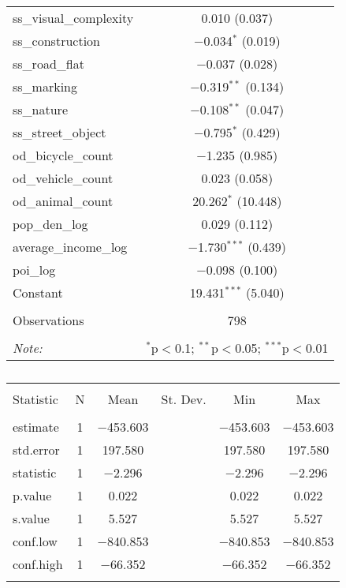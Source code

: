 \begin{table}[!htbp]
\begin{tabular}{@{\extracolsep{1pt}}lc}
  ss\_visual\_complexity & 0.010 (0.037) \\ 
  ss\_construction & $-$0.034$^{*}$ (0.019) \\ 
  ss\_road\_flat & $-$0.037 (0.028) \\ 
  ss\_marking & $-$0.319$^{**}$ (0.134) \\ 
  ss\_nature & $-$0.108$^{**}$ (0.047) \\ 
  ss\_street\_object & $-$0.795$^{*}$ (0.429) \\ 
  od\_bicycle\_count & $-$1.235 (0.985) \\ 
  od\_vehicle\_count & 0.023 (0.058) \\ 
  od\_animal\_count & 20.262$^{*}$ (10.448) \\ 
  pop\_den\_log & 0.029 (0.112) \\ 
  average\_income\_log & $-$1.730$^{***}$ (0.439) \\ 
  poi\_log & $-$0.098 (0.100) \\ 
  Constant & 19.431$^{***}$ (5.040) \\ 
 \hline \\[-1.8ex] 
Observations & 798 \\ 
\hline 
\hline \\[-1.8ex] 
\textit{Note:}  & \multicolumn{1}{r}{$^{*}$p$<$0.1; $^{**}$p$<$0.05; $^{***}$p$<$0.01} \\ 
\end{tabular} 
\end{table} 

\begin{table}[!htbp] \centering 
  \caption{} 
  \label{} 
\small 
\begin{tabular}{@{\extracolsep{1pt}}lccccc} 
\\[-1.8ex]\hline 
\hline \\[-1.8ex] 
Statistic & \multicolumn{1}{c}{N} & \multicolumn{1}{c}{Mean} & \multicolumn{1}{c}{St. Dev.} & \multicolumn{1}{c}{Min} & \multicolumn{1}{c}{Max} \\ 
\hline \\[-1.8ex] 
estimate & 1 & $-$453.603 &  & $-$453.603 & $-$453.603 \\ 
std.error & 1 & 197.580 &  & 197.580 & 197.580 \\ 
statistic & 1 & $-$2.296 &  & $-$2.296 & $-$2.296 \\ 
p.value & 1 & 0.022 &  & 0.022 & 0.022 \\ 
s.value & 1 & 5.527 &  & 5.527 & 5.527 \\ 
conf.low & 1 & $-$840.853 &  & $-$840.853 & $-$840.853 \\ 
conf.high & 1 & $-$66.352 &  & $-$66.352 & $-$66.352 \\ 
\hline \\[-1.8ex] 
\end{tabular} 
\end{table} 

